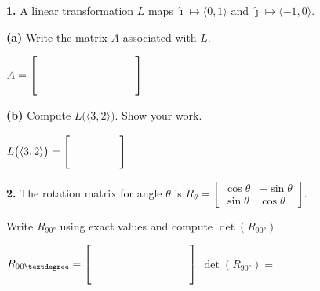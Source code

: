 \documentclass[10pt]{article}
\begin{document}
\namedateperiod
\vspace{0.12in}

\begin{notesbox}
\textbf{1.} A linear transformation $L$ maps $\hat{\imath}\mapsto\langle0,1\rangle$
and $\hat{\jmath}\mapsto\langle-1,0\rangle$.

\vspace{0.06in}
\textbf{(a)} Write the matrix $A$ associated with $L$.

\vspace{0.08in}
\hspace{1em}$A = \begin{bmatrix}\hspace{1.4cm}&\hspace{1.4cm}\\[10pt]\hspace{1.4cm}&\hspace{1.4cm}\end{bmatrix}$

\vspace{0.12in}
\textbf{(b)} Compute $L\bigl(\langle3,2\rangle\bigr)$. Show your work.


$L\bigl(\langle3,2\rangle\bigr) = \begin{bmatrix}\hspace{1.6cm}\\[8pt]\hspace{1.6cm}\end{bmatrix}$
\end{notesbox}

\vspace{0.10in}

\begin{notesbox}
\textbf{2.} The rotation matrix for angle $\theta$ is
$R_\theta = \begin{bmatrix}\cos\theta&-\sin\theta\\\sin\theta&\cos\theta\end{bmatrix}$.

\vspace{0.06in}
Write $R_{90°}$ using exact values and compute $\det(R_{90°})$.

\vspace{0.08in}
$R_{90°} = \begin{bmatrix}\hspace{1.4cm}&\hspace{1.4cm}\\[10pt]\hspace{1.4cm}&\hspace{1.4cm}\end{bmatrix}$
\qquad $\det(R_{90°}) = $ \blank{2cm}
\end{notesbox}
\end{document}
